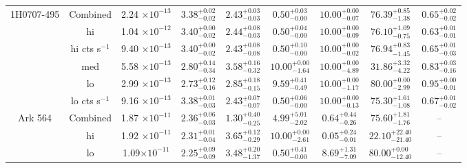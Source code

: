 \documentclass{article}
\begin{document}
\begin{landscape}
\begin{longtable}{ccccccccc}
\hline
1H0707-495 & Combined & 2.24 $\times 10^{-13}$ & $3.38^{+0.02}_{-0.02}$ &  $2.43^{+0.03}_{-0.03}$ & $0.50^{+0.03}_{-0.00}$ & $10.00^{+0.00}_{-0.07}$ & $76.39^{+0.85}_{-1.38}$ & $0.65^{+0.02}_{-0.02}$\\
& hi & 1.04 $\times 10^{-12}$ & $3.40^{+0.00}_{-0.02}$ & $2.44^{+0.08}_{-0.03}$ & $0.50^{+0.04}_{-0.00}$ & $10.00^{+0.00}_{-0.09}$ & $76.10^{+1.09}_{-0.75}$ & $0.63^{+0.01}_{-0.01}$\\
& hi cts s$^{-1}$ & 9.40 $\times 10^{-13}$ & $3.40^{+0.00}_{-0.02}$ & $2.43^{+0.08}_{-0.08}$ & $0.50^{+0.10}_{-0.00}$ & $10.00^{+0.00}_{-0.02}$ & $76.94^{+0.83}_{-1.45}$ & $0.65^{+0.01}_{-0.03}$\\
& med  & 5.58 $\times 10^{-13}$ & $2.80^{+0.14}_{-0.34}$  & $3.58^{+0.16}_{-0.32}$ & $10.00^{+0.00}_{-1.64}$ & $10.00^{+0.00}_{-4.89}$ & $31.86^{+3.32}_{-4.22}$ & $0.83^{+0.03}_{-0.16}$\\
& lo & 2.99 $\times 10^{-13}$ & $2.73^{+0.12}_{-0.16}$ & $2.85^{+0.18}_{-0.15}$ & $9.59^{+0.41}_{-0.49}$ & $10.00^{+0.00}_{-1.17}$ & $80.00^{+0.00}_{-2.99}$ & $0.95^{+0.00}_{-0.01}$\\ 
& lo cts s$^{-1}$ & 9.16 $\times 10^{-13}$ & $3.38^{+0.01}_{-0.03}$ & $2.43^{+0.07}_{-0.07}$ & $0.50^{+0.06}_{-0.00}$ & $10.00^{+0.00}_{-0.13}$ & $75.30^{+1.61}_{-1.08}$ & $0.67^{+0.01}_{-0.02}$\\ \hline

Ark 564 & Combined & 1.87 $\times 10^{-11}$ & $2.36^{+0.06}_{-0.03}$ & $1.30^{+0.40}_{-0.25}$ & $4.99^{+5.01}_{-2.02}$ & $0.64^{+0.44}_{-0.26}$ & $75.60^{+1.81}_{-1.76}$ & -- \\ 
& hi & 1.92 $\times 10^{-11}$ & $2.31^{+0.01}_{-0.04}$  & $3.65^{+0.12}_{-0.29}$ & $10.00^{+0.00}_{-2.61}$ & $0.05^{+0.24}_{-0.01}$ & $22.10^{+22.40}_{-21.40}$ & -- \\
& lo & 1.09$\times 10^{-11}$ & $2.25^{+0.09}_{-0.09}$  & $3.48^{+0.20}_{-1.37}$ & $0.50^{+0.41}_{-0.00}$ & $8.69^{+1.31}_{-7.09}$ & $80.00^{+0.00}_{-12.40}$ & -- \\ \hline 


\end{longtable}
\end{landscape}
\end{document}
